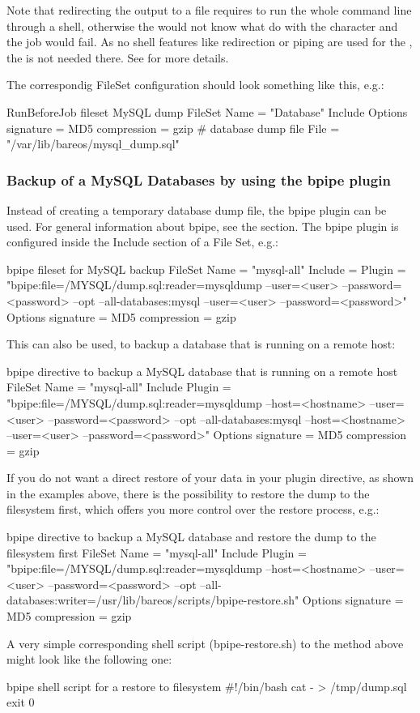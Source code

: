 Note that redirecting the  output to a file requires
to run the whole command line through a shell, otherwise the 
would not know what do with the \command{>} character and the job would fail.
As no shell features like redirection or piping are used for the ,
the  is not needed there.
See  for more details.

The correspondig FileSet configuration should look something like this, e.g.:
\begin{bconfig}{RunBeforeJob fileset MySQL dump}
FileSet {
  Name = "Database"
  Include {
    Options {
      signature = MD5
      compression = gzip
    }
  # database dump file
  File = "/var/lib/bareos/mysql_dump.sql" 
  }
}
\end{bconfig}


\subsubsection{Backup of a MySQL Databases by using the bpipe plugin}

Instead of creating a temporary database dump file,
the bpipe plugin can be used. 
For general information about bpipe, see the  section. 
The bpipe plugin is configured inside the Include section of a File Set, e.g.:
\begin{bconfig}{bpipe fileset for MySQL backup}
FileSet {
  Name = "mysql-all"
  Include = {
    Plugin = "bpipe:file=/MYSQL/dump.sql:reader=mysqldump --user=<user> --password=<password> --opt --all-databases:mysql --user=<user> --password=<password>"
    Options {
      signature = MD5
      compression = gzip
    }
  }
}
\end{bconfig}

This can also be used, to backup a database that is running on a remote host:
\begin{bconfig}{bpipe directive to backup a MySQL database that is running on a remote host}
FileSet{
  Name = "mysql-all"
  Include {
    Plugin = "bpipe:file=/MYSQL/dump.sql:reader=mysqldump --host=<hostname> --user=<user> --password=<password> --opt --all-databases:mysql --host=<hostname> --user=<user> --password=<password>"
    Options {
      signature = MD5
      compression = gzip
    }
  }
}
\end{bconfig}

If you do not want a direct restore of your data in your plugin directive, as shown in the examples above, 
there is the possibility to restore the dump to the filesystem first, which offers you more control over the restore process, e.g.:
\begin{bconfig}{bpipe directive to backup a MySQL database and restore the dump to the filesystem first}
FileSet{
  Name = "mysql-all"
  Include {
    Plugin = "bpipe:file=/MYSQL/dump.sql:reader=mysqldump --host=<hostname> --user=<user> --password=<password> --opt --all-databases:writer=/usr/lib/bareos/scripts/bpipe-restore.sh"
    Options {
      signature = MD5
      compression = gzip
    }
  }
}
\end{bconfig}

A very simple corresponding shell script (bpipe-restore.sh) to the method above might look like the following one:
\begin{bconfig}{bpipe shell script for a restore to filesystem}
#!/bin/bash
cat - > /tmp/dump.sql
exit 0
\end{bconfig}

